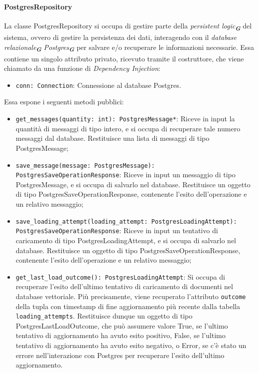 \paragraph{PostgresRepository}
\label{sec:postgres_repository}
La classe PostgresRepository si occupa di gestire parte della \emph{persistent logic}\textsubscript{\textbf{\textit{G}}} del sistema, ovvero di gestire la persistenza dei dati, interagendo con il \emph{database relazionale}\textsubscript{\textbf{\textit{G}}} \emph{Postgres}\textsubscript{\textbf{\textit{G}}} per salvare e/o recuperare le informazioni necessarie. 
Essa contiene un singolo attributo privato, ricevuto tramite il costruttore, che viene chiamato da una funzione di \emph{Dependency Injection}:
\begin{itemize}
    \item \texttt{conn: Connection}: Connessione al database Postgres.
\end{itemize}
Essa espone i seguenti metodi pubblici:
\begin{itemize}
    \item \texttt{get\_messages(quantity: int): PostgresMessage*}: Riceve in input la quantità di messaggi di tipo intero, e si occupa di recuperare tale numero messaggi dal database. Restituisce una lista di messaggi di tipo PostgresMessage;
    \item \texttt{save\_message(message: PostgresMessage): PostgresSaveOperationResponse}: Riceve in input un messaggio di tipo PostgresMessage, e si occupa di salvarlo nel database. Restituisce un oggetto di tipo PostgresSaveOperationResponse, contenente l'esito dell'operazione e un relativo messaggio;
    \item \texttt{save\_loading\_attempt(loading\_attempt: PostgresLoadingAttempt):\\ PostgresSaveOperationResponse}: Riceve in input un tentativo di caricamento di tipo PostgresLoadingAttempt, e si occupa di salvarlo nel database. Restituisce un oggetto di tipo PostgresSaveOperationResponse, contenente l'esito dell'operazione e un relativo messaggio;
    \item \texttt{get\_last\_load\_outcome(): PostgresLoadingAttempt}: Si occupa di recuperare l'esito dell'ultimo tentativo di caricamento di documenti nel database vettoriale. Più precisamente, viene recuperato l'attributo \texttt{outcome} della tupla con timestamp di fine aggiornamento più recente dalla tabella \texttt{loading\_attempts}. Restituisce dunque un oggetto di tipo PostgresLastLoadOutcome, che può assumere valore True, se l'ultimo tentativo di aggiornamento ha avuto esito positivo, False, se l'ultimo tentativo di aggiornamento ha avuto esito negativo, o Error, se c'è stato un errore nell'interazione con Postgres per recuperare l'esito dell'ultimo aggiornamento.
\end{itemize}
